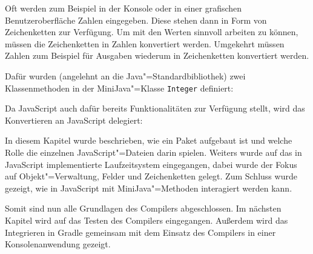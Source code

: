 Oft werden zum Beispiel in der Konsole oder in einer grafischen Benutzeroberfläche Zahlen eingegeben. Diese stehen dann in Form von Zeichenketten zur Verfügung. Um mit den Werten sinnvoll arbeiten zu können, müssen die Zeichenketten in Zahlen konvertiert werden. Umgekehrt müssen Zahlen zum Beispiel für Ausgaben wiederum in Zeichenketten konvertiert werden.

Dafür wurden (angelehnt an die Java"=Standardbibliothek) zwei Klassenmethoden in der MiniJava"=Klasse \lstinline{Integer} definiert:


\pagebreak
Da JavaScript auch dafür bereits Funktionalitäten zur Verfügung stellt, wird das Konvertieren an JavaScript delegiert:


\vspace{4em}
In diesem Kapitel wurde beschrieben, wie ein Paket aufgebaut ist und welche Rolle die einzelnen JavaScript"=Dateien darin spielen. Weiters wurde auf das in JavaScript implementierte Laufzeitsystem eingegangen, dabei wurde der Fokus auf Objekt"=Verwaltung, Felder und Zeichenketten gelegt. Zum Schluss wurde gezeigt, wie in JavaScript mit MiniJava"=Methoden interagiert werden kann.

Somit sind nun alle Grundlagen des Compilers abgeschlossen. Im nächsten Kapitel wird auf das Testen des Compilers eingegangen. Außerdem wird das Integrieren in Gradle gemeinsam mit dem Einsatz des Compilers in einer Konsolenanwendung gezeigt.
